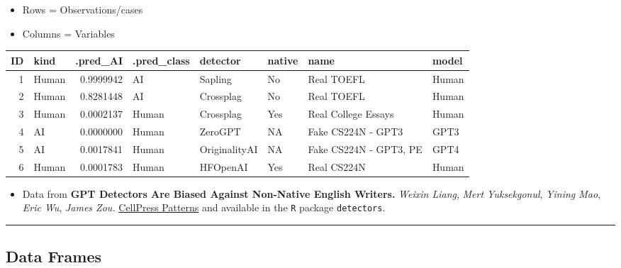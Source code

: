\documentclass[
  letterpaper,
  DIV=11,
  numbers=noendperiod]{scrartcl}
\providecommand{\tightlist}{%
  \setlength{\itemsep}{0pt}\setlength{\parskip}{0pt}}\usepackage{longtable,booktabs,array}
\begin{document}
\begin{itemize}
\item
  Rows = Observations/cases
\item
  Columns = Variables
\end{itemize}

\begin{table}
\centering\begingroup\fontsize{32}{34}\selectfont

\begin{tabular}{r|l|r|l|l|l|l|l}
\hline
ID & kind & .pred\_AI & .pred\_class & detector & native & name & model\\
\hline
1 & Human & 0.9999942 & AI & Sapling & No & Real TOEFL & Human\\
\hline
2 & Human & 0.8281448 & AI & Crossplag & No & Real TOEFL & Human\\
\hline
3 & Human & 0.0002137 & Human & Crossplag & Yes & Real College Essays & Human\\
\hline
4 & AI & 0.0000000 & Human & ZeroGPT & NA & Fake CS224N - GPT3 & GPT3\\
\hline
5 & AI & 0.0017841 & Human & OriginalityAI & NA & Fake CS224N - GPT3, PE & GPT4\\
\hline
6 & Human & 0.0001783 & Human & HFOpenAI & Yes & Real CS224N & Human\\
\hline
\end{tabular}
\endgroup{}
\end{table}

\begin{itemize}
\tightlist
\item
  Data from \textbf{GPT Detectors Are Biased Against Non-Native English
  Writers.} \emph{Weixin Liang}, \emph{Mert Yuksekgonul}, \emph{Yining
  Mao}, \emph{Eric Wu}, \emph{James Zou.}
  \href{https://doi.org/10.1016/j.patter.2023.100779}{CellPress
  Patterns} and available in the \texttt{R} package \texttt{detectors}.
\end{itemize}

\begin{center}\rule{0.5\linewidth}{0.5pt}\end{center}

\hypertarget{data-frames-1}{%
\subsection{Data Frames}\label{data-frames-1}}
\end{document}
